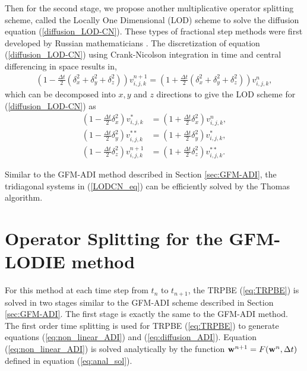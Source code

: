 Then for the second stage, we propose another multiplicative operator splitting scheme, called the Locally One Dimensional (LOD) scheme to solve the diffusion equation (\ref{diffusion_LOD-CN}). These types of fractional step methods were first developed by Russian mathematicians \cite{Yakonov_1963,Yanenko_1963,Yanenko_1967}. The discretization of equation (\ref{diffusion_LOD-CN}) using Crank-Nicolson integration in time and central differencing in space results in, 
\begin{eqnarray}
	\left(1-\frac{\Delta t}{2}(\delta^2_x+\delta^2_y+\delta^2_z)\right)v_{i,j,k}^{n+1}=\left(1+\frac{\Delta t}{2}(\delta^2_x+\delta^2_y+\delta^2_z)\right)v_{i,j,k}^n,
\end{eqnarray}
which can be decomposed into $x,y$ and $z$ directions to give the LOD scheme for (\ref{diffusion_LOD-CN}) as
\begin{eqnarray}
	\left(1-\frac{\Delta t}{2}\delta_x^2\right)v^*_{i,j,k}&=\left(1+\frac{\Delta t}{2}\delta_x^2\right)v^n_{i,j,k},\nonumber\\
	\left(1-\frac{\Delta t}{2}\delta_y^2\right)v^{**}_{i,j,k}&=\left(1+\frac{\Delta t}{2}\delta_y^2\right)v^*_{i,j,k},\nonumber\\
	\left(1-\frac{\Delta t}{2}\delta_z^2\right)v^{n+1}_{i,j,k}&=\left(1+\frac{\Delta t}{2}\delta_z^2\right)v^{**}_{i,j,k}.\nonumber\label{LODCN_eq}
\end{eqnarray}

Similar to the GFM-ADI method described in Section \ref{sec:GFM-ADI}, the tridiagonal systems in (\ref{LODCN_eq}) can be efficiently solved by the Thomas algorithm. 


\section{Operator Splitting for the GFM-LODIE method}

For this method at each time step from $t_n$ to $t_{n+1}$, the TRPBE (\ref{eq:TRPBE}) is  solved in two stages similar to the GFM-ADI scheme described in Section \ref{sec:GFM-ADI}. 
The first stage is exactly the same to the GFM-ADI method. The first order time splitting is used for 
 TRPBE (\ref{eq:TRPBE}) to generate   equations (\ref{eq:non_linear_ADI}) and (\ref{eq:diffusion_ADI}). Equation (\ref{eq:non_linear_ADI}) is solved analytically by the function ${\bf w}^{n+1}=F({\bf w}^n,\Delta t)$ defined in equation (\ref{eq:anal_sol}).
 

